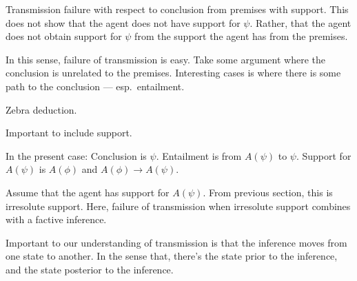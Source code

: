 \documentclass[10pt]{article}
\begin{document}
\begin{note}
  Transmission failure with respect to conclusion from premises with support.
  This does not show that the agent does not have support for \(\psi\).
  Rather, that the agent does not obtain support for \(\psi\) from the support the agent has from the premises.

  In this sense, failure of transmission is easy.
  Take some argument where the conclusion is unrelated to the premises.
  Interesting cases is where there is some path to the conclusion --- esp.\ entailment.

  Zebra deduction.

  Important to include support.

  In the present case:
  Conclusion is \(\psi\).
  Entailment is from \(A(\psi)\) to \(\psi\).
  Support for \(A(\psi)\) is \(A(\phi)\) and \(A(\phi) \rightarrow A(\psi)\).

  Assume that the agent has support for \(A(\psi)\).
  From previous section, this is irresolute support.
  Here, failure of transmission when irresolute support combines with a factive inference.

  Important to our understanding of transmission is that the inference moves from one state to another.
  In the sense that, there's the state prior to the inference, and the state posterior to the inference.
\end{note}
\end{document}
